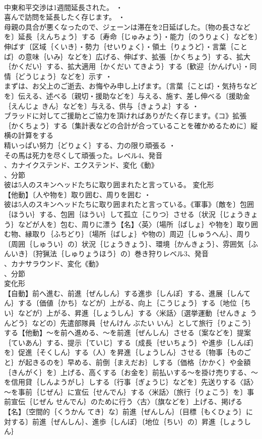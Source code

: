\documentclass[8pt]{extreport}
\begin{document}
\begin{CJK}{UTF8}{min}
\\	中東和平交渉は1週間延長された。 ・
\\	喜んで訪問を延長したく存じます。 ・
\\	母親の具合が悪くなったので、ジェーンは滞在を2日延ばした。〔物の長さなどを〕延長｛えんちょう｝する〔寿命｛じゅみょう｝・能力｛のうりょく｝などを〕伸ばす〔区域｛くいき｝・勢力｛せいりょく｝・領土｛りょうど｝・言葉｛ことば｝の意味｛いみ｝などを〕広げる、伸ばす、拡張｛かくちょう｝する、拡大｛かくだい｝する、拡大適用｛かくだい てきよう｝する〔歓迎｛かんげい｝・同情｛どうじょう｝などを〕示す ・
\\	まずは、お父上のご逝去、お悔やみ申し上げます。〔言葉｛ことば｝・気持ちなどを〕伝える、述べる〔親切・援助などを〕与える、施す、差し伸べる〔援助金｛えんじょ きん｝などを〕与える、供与｛きょうよ｝する ・
\\	ブラッドに対してご援助とご協力を頂ければありがたく存じます。《コ》拡張｛かくちょう｝する〔集計表などの合計が合っていることを確かめるために〕縦横の計算をする
\\	精いっぱい努力｛どりょく｝する、力の限り頑張る ・
\\	その馬は死力を尽くして頑張った。レベル4、発音
\\	、カナイクステンド、エクステンド、変化《動》
\\	、分節
\\	彼は5人のスキンヘッドたちに取り囲まれたと言っている。	変化形 
\\	【他動】〔人や物を〕取り囲む、周りを囲む ・
\\	彼は5人のスキンヘッドたちに取り囲まれたと言っている。《軍事》〔敵を〕包囲｛ほうい｝する、包囲｛ほうい｝して孤立｛こりつ｝させる〔状況｛じょうきょう｝などが人を〕包む、周りに漂う【名】〈英〉〔場所｛ばしょ｝や物を〕取り囲む物、縁取り｛ふちどり｝〔場所｛ばしょ｝や物の〕周辺｛しゅうへん｝、周り〔周囲｛しゅうい｝の〕状況｛じょうきょう｝、環境｛かんきょう｝、雰囲気｛ふんいき｝〔狩猟法｛しゅりょうほう｝の〕巻き狩りレベル3、発音
\\	、カナサラウンド、変化《動》
\\	、分節
\\	変化形 
\\	【自動】前へ進む、前進｛ぜんしん｝する進歩｛しんぽ｝する、進展｛しんてん｝する〔価値｛かち｝などが〕上がる、向上｛こうじょう｝する〔地位｛ちい｝などが〕上がる、昇進｛しょうしん｝する〈米話〉〔選挙運動｛せんきょ うんどう｝などの〕先遣部隊員｛せんけん ぶたい いん｝として旅行｛りょこう｝する【他動】～を前へ進める、～を前進｛ぜんしん｝させる〔案などを〕提案｛ていあん｝する、提示｛ていじ｝する〔成長｛せいちょう｝や進歩｛しんぽ｝を〕促進｛そくしん｝する（人）を昇進｛しょうしん｝させる〔物事｛ものごと｝が起きるのを〕早める、前倒｛まえだお｝しする〔価格｛かかく｝や金額｛きんがく｝を〕上げる、高くする〔お金を〕前払いする～を掛け売りする、～を信用貸｛しんようがし｝しする〔行事｛ぎょうじ｝などを〕先送りする〈話〉～を事前｛じぜん｝に宣伝｛せんでん｝する〈米話〉〔旅行｛りょこう｝を〕事前宣伝｛じぜん せんでん｝のために行う〈古〉〔旗などを〕上げる、掲げる【名】〔空間的｛くうかん てき｝な〕前進｛ぜんしん｝〔目標｛もくひょう｝に対する〕前進｛ぜんしん｝、進歩｛しんぽ｝〔地位｛ちい｝の〕昇進｛しょうしん｝

\end{CJK}
\end{document}
